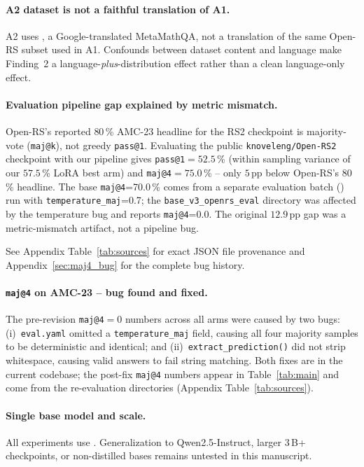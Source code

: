 \documentclass[11pt]{article}
\newcommand{\armA}{\textsc{A1}}
\newcommand{\armB}{\textsc{A2}}
\begin{document}
\paragraph{\armB{} dataset is not a faithful translation of \armA{}.}
\armB{} uses , a
Google-translated MetaMathQA, not a translation of the same Open-RS
subset used in \armA{}. Confounds between dataset content and
language make Finding~2 a language-\emph{plus}-distribution effect
rather than a clean language-only effect.

\paragraph{Evaluation pipeline gap explained by metric mismatch.}
Open-RS's reported $80$\,\% AMC-23 headline for the RS2 checkpoint is
majority-vote (\texttt{maj@k}), not greedy \texttt{pass@1}. Evaluating
the public \texttt{knoveleng/Open-RS2} checkpoint with our pipeline
gives \texttt{pass@1}$=52.5$\,\% (within sampling variance of our
$57.5$\,\% LoRA best arm) and \texttt{maj@4}$=75.0$\,\% -- only
$5$\,pp below Open-RS's $80$\,\% headline. The base
\texttt{maj@4}=70.0\,\% comes from a separate evaluation batch
() run with \texttt{temperature\_maj}=0.7;
the \texttt{base\_v3\_openrs\_eval} directory was affected by the
temperature bug and reports \texttt{maj@4}=0.0. The original
$12.9$\,pp gap was a metric-mismatch artifact, not a pipeline bug.

See Appendix Table~\ref{tab:sources} for exact JSON file provenance and
Appendix~\ref{sec:maj4_bug} for the complete bug history.


\paragraph{\texttt{maj@4} on AMC-23 -- bug found and fixed.}
The pre-revision \texttt{maj@4}$=0$ numbers across all arms were caused
by two bugs: (i)~\texttt{eval.yaml} omitted a \texttt{temperature\_maj}
field, causing all four majority samples to be deterministic and
identical; and (ii)~\texttt{extract\_prediction()} did not strip
whitespace, causing valid answers to fail string matching. Both fixes
are in the current codebase; the post-fix \texttt{maj@4} numbers appear
in Table~\ref{tab:main} and come from the  re-evaluation
directories (Appendix Table~\ref{tab:sources}).

\paragraph{Single base model and scale.}
All experiments use
.
Generalization to Qwen2.5-Instruct, larger 3\,B+ checkpoints, or
non-distilled bases remains untested in this manuscript.
\end{document}
